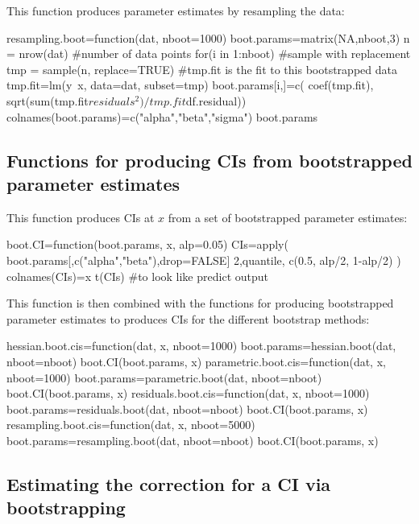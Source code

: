 {This function produces parameter estimates by resampling the data:
\begin{Schunk}
\begin{Sinput}
 resampling.boot=function(dat, nboot=1000){
   boot.params=matrix(NA,nboot,3)
   n = nrow(dat) #number of data points
   for(i in 1:nboot){
     #sample with replacement
     tmp = sample(n, replace=TRUE)
     #tmp.fit is the fit to this bootstrapped data
     tmp.fit=lm(y~x, data=dat, subset=tmp)
     boot.params[i,]=c(
       coef(tmp.fit),
       sqrt(sum(tmp.fit$residuals^2)/tmp.fit$df.residual))
   }
   colnames(boot.params)=c("alpha","beta","sigma")
   boot.params
 }
\end{Sinput}
\end{Schunk}

\subsection{Functions for producing CIs from bootstrapped parameter estimates}

This function produces CIs at $x$ from a set of bootstrapped parameter estimates:
\begin{Schunk}
\begin{Sinput}
 boot.CI=function(boot.params, x, alp=0.05){
   CIs=apply(
     boot.params[,c("alpha","beta"),drop=FALSE]%*%rbind(1,x),
     2,quantile, c(0.5, alp/2, 1-alp/2) )
   colnames(CIs)=x
   t(CIs) #to look like predict output
 }
\end{Sinput}
\end{Schunk}

This function is then combined with the functions for producing bootstrapped parameter estimates to produces CIs for the different bootstrap methods:
\begin{Schunk}
\begin{Sinput}
 hessian.boot.cis=function(dat, x, nboot=1000){
   boot.params=hessian.boot(dat, nboot=nboot)
   boot.CI(boot.params, x)
 }
 parametric.boot.cis=function(dat, x, nboot=1000){
   boot.params=parametric.boot(dat, nboot=nboot)
   boot.CI(boot.params, x)
 }
 residuals.boot.cis=function(dat, x, nboot=1000){
   boot.params=residuals.boot(dat, nboot=nboot)
   boot.CI(boot.params, x)
 }
 resampling.boot.cis=function(dat, x, nboot=5000){
   boot.params=resampling.boot(dat, nboot=nboot)
   boot.CI(boot.params, x)
 }
\end{Sinput}
\end{Schunk}

\subsection{Estimating the correction for a CI via bootstrapping}

}
